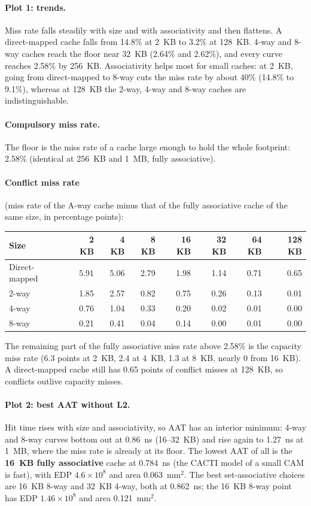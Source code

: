 \documentclass[11pt]{article}
\begin{document}
\paragraph{Plot 1: trends.} Miss rate falls steadily with size and with associativity and then flattens. A direct-mapped cache falls from 14.8\% at 2~KB to 3.2\% at 128~KB. 4-way and 8-way caches reach the floor near 32~KB (2.64\% and 2.62\%), and every curve reaches 2.58\% by 256~KB. Associativity helps most for small caches: at 2~KB, going from direct-mapped to 8-way cuts the miss rate by about 40\% (14.8\% to 9.1\%), whereas at 128~KB the 2-way, 4-way and 8-way caches are indistinguishable.

\paragraph{Compulsory miss rate.} The floor is the miss rate of a cache large enough to hold the whole footprint: 2.58\% (identical at 256~KB and 1~MB, fully associative).

\paragraph{Conflict miss rate} (miss rate of the A-way cache minus that of the fully associative cache of the same size, in percentage points):
\begin{center}\small
\begin{tabular}{lrrrrrrr}\toprule
Size & 2 KB & 4 KB & 8 KB & 16 KB & 32 KB & 64 KB & 128 KB\\\midrule
Direct-mapped & 5.91 & 5.06 & 2.79 & 1.98 & 1.14 & 0.71 & 0.65\\
2-way & 1.85 & 2.57 & 0.82 & 0.75 & 0.26 & 0.13 & 0.01\\
4-way & 0.76 & 1.04 & 0.33 & 0.20 & 0.02 & 0.01 & 0.00\\
8-way & 0.21 & 0.41 & 0.04 & 0.14 & 0.00 & 0.01 & 0.00\\\bottomrule
\end{tabular}\end{center}
The remaining part of the fully associative miss rate above 2.58\% is the capacity miss rate (6.3 points at 2~KB, 2.4 at 4~KB, 1.3 at 8~KB, nearly 0 from 16~KB). A direct-mapped cache still has 0.65 points of conflict misses at 128~KB, so conflicts outlive capacity misses.

\paragraph{Plot 2: best AAT without L2.} Hit time rises with size and associativity, so AAT has an interior minimum: 4-way and 8-way curves bottom out at 0.86~ns (16--32~KB) and rise again to 1.27~ns at 1~MB, where the miss rate is already at its floor. The lowest AAT of all is the \textbf{16~KB fully associative} cache at 0.784~ns (the CACTI model of a small CAM is fast), with EDP $4.6\times10^{8}$ and area 0.063~mm$^2$. The best set-associative choices are 16~KB 8-way and 32~KB 4-way, both at 0.862~ns; the 16~KB 8-way point has EDP $1.46\times10^{8}$ and area 0.121~mm$^2$.
\end{document}
